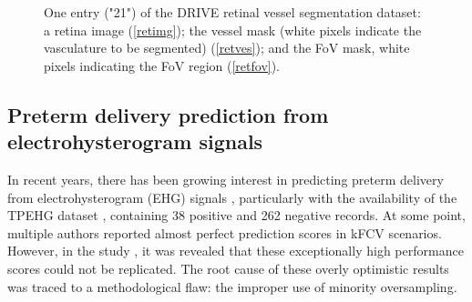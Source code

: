 \documentclass[3p, times]{elsarticle}
\begin{document}
\begin{figure}[t]
\begin{center}
\end{center}
\caption{One entry ("21") of the DRIVE retinal vessel segmentation dataset: a retina image (\ref{retimg}); the vessel mask (white pixels indicate the vasculature to be segmented) (\ref{retves}); and the FoV mask, white pixels indicating the FoV region (\ref{retfov}).}
\label{fig:retina}
\end{figure}
    
\subsection{Preterm delivery prediction from electrohysterogram signals}
\label{sec:ehg}

In recent years, there has been growing interest in predicting preterm delivery from electrohysterogram (EHG) signals \cite{ehgreview}, particularly with the availability of the TPEHG dataset \cite{tpehg}, containing 38 positive and 262 negative records.
At some point, multiple authors reported almost perfect prediction scores in kFCV scenarios. However, in the study \cite{ehg}, it was revealed that these exceptionally high performance scores could not be replicated. The root cause of these overly optimistic results was traced to a methodological flaw: the improper use of minority oversampling.
\end{document}
